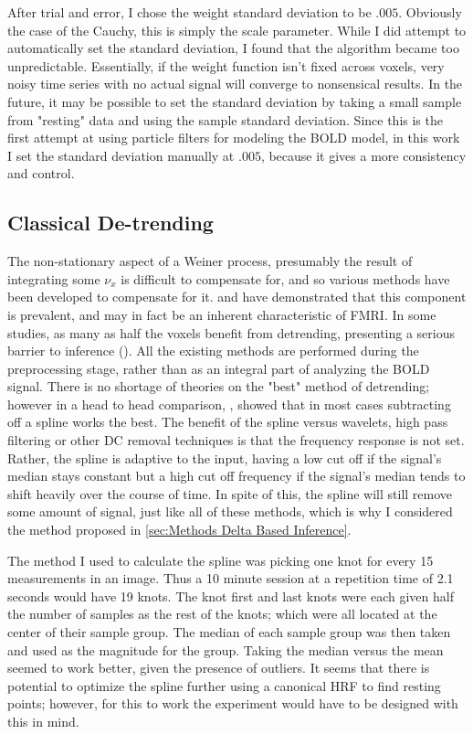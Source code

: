After trial and error, I chose the weight standard deviation to be $.005$. Obviously
the case of the Cauchy, this is simply the scale parameter. While I 
did attempt to automatically set the standard deviation, I found that the algorithm
became too unpredictable. Essentially, if the weight function isn't
fixed across voxels, very noisy time series with no actual signal will 
converge to nonsensical results. 
In the future, it may be possible to set the standard deviation by
taking a small sample from "resting" data and using the sample standard deviation.
Since this is the first attempt at using particle filters for modeling the 
BOLD model, in this work I set the standard deviation manually at $.005$,
because it gives a more consistency and control. 

\subsection{Classical De-trending}
\label{sec:Detrend}
The non-stationary
aspect of a Weiner process, presumably the result of integrating some
$\nu_x$ is difficult to compensate for, and so various methods
have been developed to compensate for it. \cite{Tanabe2002} and \cite{Smith1999} have
demonstrated that this component is prevalent, and may in fact be an inherent  characteristic
of FMRI. In some studies, as many as half the voxels benefit from detrending, presenting
a serious barrier to inference (\cite{Smith2007}). All the existing methods are performed
during the preprocessing stage, rather than as an integral part of analyzing the BOLD
signal. There is no shortage of theories on the "best" method of detrending; however
in a head to head comparison, \cite{Tanabe2002}, showed that in most cases subtracting off
a spline works the best. The benefit of the spline versus wavelets, high pass 
filtering or other DC removal techniques is that the frequency response is not set.
Rather, the spline is adaptive to the input, having a low cut off if the signal's 
median stays constant but a high cut off frequency if the signal's median tends to
shift heavily over the course of time. In spite of this, the spline will still remove some
amount of signal, just like all of these methods, which is why I considered the method proposed
in \autoref{sec:Methods Delta Based Inference}.

The method I used to calculate the spline was picking one knot for every 15
measurements in an image. Thus a 10 minute session at a repetition time of 
2.1 seconds would have 19 knots. The knot first and last knots were each 
given half the number of samples as the rest of the knots; which were all 
located at the center of their sample group. The median of each sample group
was then taken and used as the magnitude for the group. Taking the median 
versus the mean seemed to work better, given the presence of outliers. It seems
that there is potential to optimize the spline further using a canonical 
HRF to find resting points; however, for this to work the experiment would have
to be designed with this in mind. 

